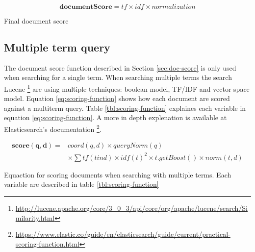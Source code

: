 \begin{cequation}[H]
	\begin{equation}
		\mathbf{documentScore} = tf \times idf \times normalization
	\end{equation}
	\caption{Final document score}
  \label{eq:document-score}
\end{cequation}

\subsection{Multiple term query}
The document score function described in Section \ref{sec:doc-score} is only used when searching for a single term.
When searching multiple terms the search Lucene \footnote{\url{http://lucene.apache.org/core/3_0_3/api/core/org/apache/lucene/search/Similarity.html}}
are using multiple techniques: boolean model, TF/IDF and vector space model.
Equation \ref{eq:scoring-function} shows how each document are scored against a multiterm query.
Table \ref{tbl:scoring-function} explaines each variable in equation \ref{eq:scoring-function}.
A more in depth explenation is available at Elasticsearch's documentation \footnote{\url{https://www.elastic.co/guide/en/elasticsearch/guide/current/practical-scoring-function.html}}.

\begin{cequation}
	\begin{equation}
		\begin{aligned}
			\mathbf{score(q,d)} = & coord(q,d) \times queryNorm(q) \\
														& \times \sum tf(t in d) \times idf(t)^2 \times t.getBoost() \times norm(t,d)
		\end{aligned}
	\end{equation}
	\caption{Equaction for scoring documents when searching with multiple terms. Each variable are described in table \ref{tbl:scoring-function}}
  \label{eq:scoring-function}
\end{cequation}

